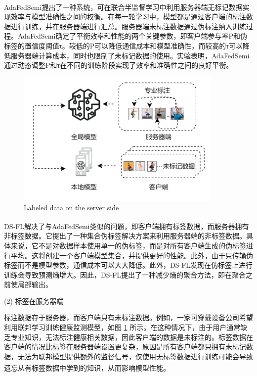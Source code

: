 AdaFedSemi\textsuperscript{\cite{wang2022enhancing}}提出了一种系统，可在联合半监督学习中利用服务器端无标记数据实现效率与模型准确性之间的权衡。在每一轮学习中，模型都是通过客户端的标注数据进行训练，并在服务器端进行汇总。服务器端未标注数据通过伪标注纳入训练过程。AdaFedSemi确定了平衡效率和性能的两个关键参数，即客户端参与率P和伪标签的置信度阈值τ。较低的P可以降低通信成本和模型准确性，而较高的τ可以降低服务器端计算成本，同时也限制了未标记数据的使用。实验表明，AdaFedSemi通过动态调整P和τ在不同的训练阶段实现了效率和准确性之间的良好平衡。

\vspace{-0.1cm}
\begin{figure}[!htbp]
	\centering
	\includegraphics[width=10cm]{chapters/imgs/LabelAtServer}
	{\wuhao Labeled data on the server side}
	\label{LabelAtServer}
\end{figure}
\vspace{-0.35cm}

DS-FL\textsuperscript{\cite{itahara2021distillation}}解决了与AdaFedSemi类似的问题，即客户端拥有标签数据，而服务器拥有非标签数据。它提出了一种集合伪标签解决方案来利用服务器端的非标签数据。具体来说，它不是对数据样本使用单一的伪标签，而是对所有客户端生成的伪标签进行平均。这将创建一个客户端模型集合，并提供更好的性能。此外，由于只传输伪标签而不是模型参数，通信成本可以大大降低。此外，DS-FL发现在伪标签上进行训练会导致预测熵增大。因此，DS-FL提出了一种减少熵的聚合方法，即在聚合之前使局部输出。

(2) 标签在服务器端

标注数据存于服务器，而客户端只有未标注数据。例如，一家可穿戴设备公司希望利用联邦学习训练健康监测模型，如图 \ref{LabelAtServer} 所示。在这种情况下，由于用户通常缺乏专业知识，无法标注健康相关数据，因此客户端的数据是未标注的。标签数据在客户端的情况比标签在服务器端设置更复杂，原因是所有客户端都只拥有未标记数据，无法为联邦模型提供额外的监督信号，仅使用无标签数据进行训练可能会导致遗忘从有标签数据中学到的知识，从而影响模型性能\textsuperscript{\cite{jeong2020federated,diao2022semifl}}。

